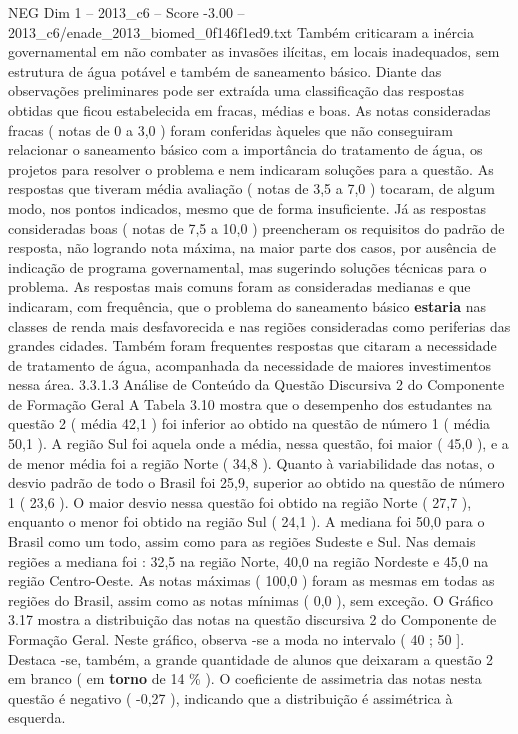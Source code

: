 \begin{textsample}{NEG Dim 1 – 2013\_c6 – Score -3.00 – 2013\_c6/enade\_2013\_biomed\_0f146f1ed9.txt}
Também criticaram a inércia governamental em não combater as invasões ilícitas, em locais inadequados, sem estrutura de água potável e também de saneamento básico.
Diante das observações preliminares pode ser extraída uma classificação das respostas obtidas que ficou estabelecida em fracas, médias e boas.
As notas consideradas fracas ( notas de 0 a 3,0 ) foram conferidas àqueles que não conseguiram relacionar o saneamento básico com a importância do tratamento de água, os projetos para resolver o problema e nem indicaram soluções para a questão.
As respostas que tiveram média avaliação ( notas de 3,5 a 7,0 ) tocaram, de algum modo, nos pontos indicados, mesmo que de forma insuficiente.
Já as respostas consideradas boas ( notas de 7,5 a 10,0 ) preencheram os requisitos do padrão de resposta, não logrando nota máxima, na maior parte dos casos, por ausência de indicação de programa governamental, mas sugerindo soluções técnicas para o problema.
As respostas mais comuns foram as consideradas medianas e que indicaram, com frequência, que o problema do saneamento básico \textbf{estaria} nas classes de renda mais desfavorecida e nas regiões consideradas como periferias das grandes cidades.
Também foram frequentes respostas que citaram a necessidade de tratamento de água, acompanhada da necessidade de maiores investimentos nessa área. 3.3.1.3 Análise de Conteúdo da Questão Discursiva 2 do Componente de Formação Geral A Tabela 3.10 mostra que o desempenho dos estudantes na questão 2 ( média 42,1 ) foi inferior ao obtido na questão de número 1 ( média 50,1 ).
A região Sul foi aquela onde a média, nessa questão, foi maior ( 45,0 ), e a de menor média foi a região Norte ( 34,8 ).
Quanto à variabilidade das notas, o desvio padrão de todo o Brasil foi 25,9, superior ao obtido na questão de número 1 ( 23,6 ).
O maior desvio nessa questão foi obtido na região Norte ( 27,7 ), enquanto o menor foi obtido na região Sul ( 24,1 ).
A mediana foi 50,0 para o Brasil como um todo, assim como para as regiões Sudeste e Sul.
Nas demais regiões a mediana foi : 32,5 na região Norte, 40,0 na região Nordeste e 45,0 na região Centro-Oeste.
As notas máximas ( 100,0 ) foram as mesmas em todas as regiões do Brasil, assim como as notas mínimas ( 0,0 ), sem exceção.
O Gráfico 3.17 mostra a distribuição das notas na questão discursiva 2 do Componente de Formação Geral.
Neste gráfico, observa -se a moda no intervalo ( 40 ; 50 ].
Destaca -se, também, a grande quantidade de alunos que deixaram a questão 2 em branco ( em \textbf{torno} de 14 \% ).
O coeficiente de assimetria das notas nesta questão é negativo ( -0,27 ), indicando que a distribuição é assimétrica à esquerda.

\end{textsample}
